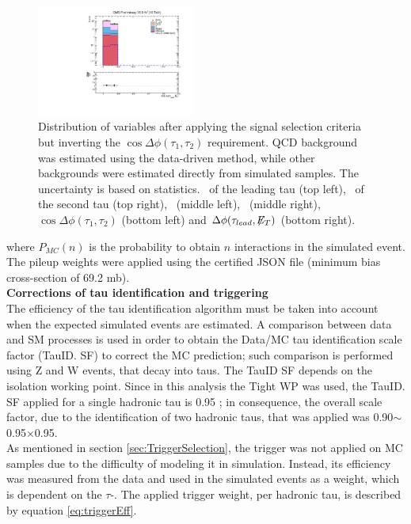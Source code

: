 \begin{figure}[H]
\begin{center}
 \includegraphics[clip,width=0.46\textwidth]{figuras/Chapter5/Plots_CosDphiInv/cosDphiTauMET.pdf} \hfill
 \end{center}
 \caption{Distribution of variables after applying the signal selection criteria but inverting
 the $\cos\Delta \phi (\tau_{1},\tau_{2})$ requirement. QCD background was estimated 
 using the data-driven method, while other backgrounds were estimated  directly 
 from simulated samples. The uncertainty is based on statistics. \pt~of the leading tau (top left),
 \pt~of the second tau (top right), \MET~(middle left), \mass~(middle right), 
 $\cos\Delta \phi (\tau_{1},\tau_{2})$ (bottom left) and $\Delta \phi (\tau_{lead}, \not\!\!E_T)$ (bottom right).}
\label{fig:cosDphiInv}
 \end{figure}

 
\noindent where $P_{MC}(n)$ is the probability to 
obtain $n$ interactions in the simulated event. The pileup weights 
were applied using the certified JSON file (minimum bias 
cross-section of 69.2 mb).\\

\textbf{Corrections of tau identification and triggering} \\

\noindent The efficiency of the tau identification algorithm 
must be taken into account when the expected 
simulated events are estimated. A comparison 
between data and SM processes is used in order 
to obtain the Data/MC tau identification scale factor (TauID. SF)
to correct the MC prediction; such comparison is performed using 
Z and W events, that decay into taus. The TauID SF depends on the 
isolation working point. Since in this analysis the Tight WP was used,
the TauID. SF applied for a single hadronic tau is 0.95 
\cite{CMS-PAS-TAU-16-002}; in consequence, the overall scale factor,
due to the identification of two hadronic taus, that was 
applied was 0.90$\sim$0.95$\times$0.95.\\

\noindent As mentioned in section \ref{sec:TriggerSelection}, the trigger
was not applied on MC samples due to the difficulty of modeling 
it in simulation. Instead, its efficiency was measured from the data 
and used in the simulated events as a weight, which is dependent on 
the $\tau$-\pt. The  applied trigger weight, per hadronic tau,
is described by equation \ref{eq:triggerEff}. \\

